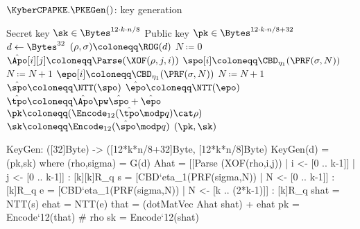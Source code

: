 \begin{algorithm}
  \caption{$\KyberCPAPKE.\PKEGen()$: key generation
  \label{kybercpa-gen}}
  \begin{algorithmic}[1]
    \Ensure Secret key $\sk \in \Bytes^{12\cdot k\cdot n/8}$
    \Ensure Public key $\pk \in \Bytes^{12\cdot k\cdot n/8 + 32}$
    \State $d \gets \Bytes^{32}$                  \label{line:secretrandomness}
    \State $(\rho, \sigma) \coloneqq \ROG(d)$ 
    \State $N \coloneqq 0$
               
      \State $\hat{\Apo}[i][j] \coloneqq \Parse(\XOF(\rho, j, i))$
    \EndFor
    \EndFor
               
    \State $\spo[i] \coloneqq \CBD_{\eta_1}(\PRF(\sigma, N))$
    \State $N \coloneqq N+1$
    \EndFor
               
    \State $\epo[i] \coloneqq \CBD_{\eta_1}(\PRF(\sigma, N))$
    \State $N \coloneqq N+1$
    \EndFor
    \State $\hat{\spo} \coloneqq \NTT(\spo)$\label{line:kybercpa-gen:ntts}
    \State $\hat{\epo} \coloneqq \NTT(\epo)$
    \State $\hat{\tpo} \coloneqq \hat{\Apo} \pw \hat{\spo} + \hat{\epo}$\label{line:kybercpa-gen:invnttas}
    \State $\pk \coloneqq (\Encode_{12}(\hat{\tpo} \modp q)\cat\rho)$\Comment{$\pk \coloneqq \Apo\spo + \epo$}
    \State $\sk \coloneqq \Encode_{12}(\hat{\spo} \modp q)$\Comment{$\sk \coloneqq \spo$}
    \State \Return $(\pk, \sk)$
  \end{algorithmic}
\end{algorithm}

\begin{code}
  KeyGen: ([32]Byte) -> ([12*k*n/8+32]Byte, [12*k*n/8]Byte)
  KeyGen(d) = (pk,sk) where
    (rho,sigma) = G(d)
    Ahat = [[Parse (XOF(rho,i,j)) | i <- [0 .. k-1]] | j <- [0 .. k-1]] : [k][k]R_q
    s = [CBD`{eta_1}(PRF(sigma,N)) | N <- [0 .. k-1]] : [k]R_q
    e = [CBD`{eta_1}(PRF(sigma,N)) | N <- [k .. (2*k-1)]] : [k]R_q
    shat = NTT(s)
    ehat = NTT(e)
    that = (dotMatVec Ahat shat) + ehat
    pk = Encode`{12}(that) # rho
    sk = Encode`{12}(shat)
\end{code}

